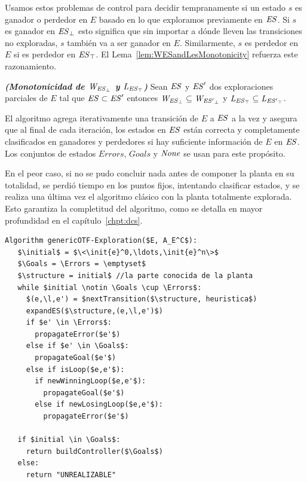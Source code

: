 Usamos estos problemas de control para decidir tempranamente si un estado $s$ es ganador o perdedor en $E$ basado en lo que exploramos previamente en $\mathit{ES}$. Si $s$ es ganador en $\mathit{{\mathit{ES}}_{\bot}}$ esto significa que sin importar a dónde lleven las transiciones no exploradas, $s$ también va a ser ganador en $E$. Similarmente, $s$ es perdedor en $E$ si es perdedor en $\mathit{{\mathit{ES}}_{\top}}$.
El Lema~\ref{lem:WESandLesMonotonicity} refuerza este razonamiento.


\begin{lemma}\textbf{\emph{(Monotonicidad de $\mathit{W_{\mathit{{\mathit{ES}}_{\bot}}}}$ y $\mathit{L_{\mathit{{\mathit{ES}}_{\top}}}}$)}}
	\label{lem:WESandLesMonotonicity}
	Sean $\mathit{ES}$ y $\mathit{ES}'$ dos exploraciones parciales de $E$ tal que $\mathit{ES} 
	\subset \mathit{ES}'$ entonces $\mathit{W_{\mathit{{\mathit{ES}}_{\bot}}}} \subseteq \mathit{W_{\mathit{{\mathit{ES}'}_{\bot}}}}$ y $\mathit{L_{\mathit{{\mathit{ES}}_{\top}}}} \subseteq 
	\mathit{L_{\mathit{{\mathit{ES}'}_{\top}}}}$.
\end{lemma}

El algoritmo agrega iterativamente una transición de $E$ a $\mathit{ES}$ a la vez y asegura que al final de cada iteración, los estados en $\mathit{ES}$ están correcta y completamente clasificados en ganadores y perdedores si hay suficiente información de $E$ en $\mathit{ES}$. Los conjuntos de estados $Errors$, 
$Goals$ y $\mathit{None}$ se usan para este propósito.



En el peor caso, si no se pudo concluir nada antes de componer la planta en su totalidad, se perdió tiempo en los puntos fijos, intentando clasificar estados, y se realiza una última vez el algoritmo clásico con la planta totalmente explorada. Esto garantiza la completitud del algoritmo, como se detalla en mayor profundidad en el capítulo~\ref{chpt:dcs}.

\begin{lstlisting}[language={pseudocode},label={lst:on-the-fly},caption={Nuestro enfoque on-the-fly},float=ht]
Algorithm genericOTF-Exploration($E, A_E^C$):
   $\initial$ = $\<\init{e}^0,\ldots,\init{e}^n\>$
   $\Goals = \Errors = \emptyset$
   $\structure = initial$ //la parte conocida de la planta
   while $initial \notin \Goals \cup \Errors$:
     $(e,\l,e') = $nextTransition($\structure, heuristica$)
     expandES($\structure,(e,\l,e')$)
     if $e' \in \Errors$:
       propagateError($e'$)
     else if $e' \in \Goals$:
       propagateGoal($e'$)
     else if isLoop($e,e'$):
       if newWinningLoop($e,e'$):
         propagateGoal($e'$)
       else if newLosingLoop($e,e'$):
         propagateError($e'$)
         
   if $initial \in \Goals$:
     return buildController($\Goals$)
   else:
     return "UNREALIZABLE"  
\end{lstlisting}

